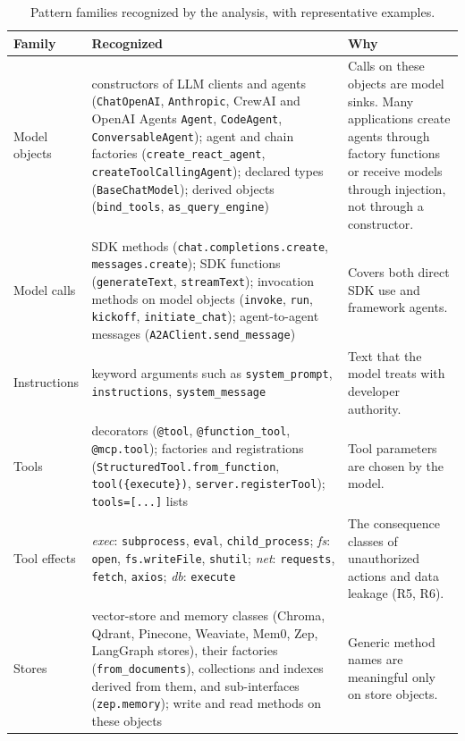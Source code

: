 \begin{table}[t]
\centering
\footnotesize
\renewcommand{\arraystretch}{1.2}
\setlength{\tabcolsep}{4pt}
\caption{Pattern families recognized by the analysis, with representative examples.}
\label{tab:df-recognition}
\begin{tabular}{@{}>{\raggedright\arraybackslash}p{}>{\raggedright\arraybackslash}p{}>{\raggedright\arraybackslash}p{}@{}}
\toprule
\textbf{Family} & \textbf{Recognized} & \textbf{Why} \\
\midrule
Model objects & constructors of LLM clients and agents (\texttt{ChatOpenAI}, \texttt{Anthropic}, CrewAI and OpenAI Agents \texttt{Agent}, \texttt{CodeAgent}, \texttt{ConversableAgent}); agent and chain factories (\texttt{create\_react\_agent}, \texttt{createToolCallingAgent}); declared types (\texttt{BaseChatModel}); derived objects (\texttt{bind\_tools}, \texttt{as\_query\_engine}) & Calls on these objects are model sinks. Many applications create agents through factory functions or receive models through injection, not through a constructor. \\
Model calls & SDK methods (\texttt{chat.completions.create}, \texttt{messages.create}); SDK functions (\texttt{generateText}, \texttt{streamText}); invocation methods on model objects (\texttt{invoke}, \texttt{run}, \texttt{kickoff}, \texttt{initiate\_chat}); agent-to-agent messages (\texttt{A2AClient.send\_message}) & Covers both direct SDK use and framework agents. \\
Instructions & keyword arguments such as \texttt{system\_prompt}, \texttt{instructions}, \texttt{system\_message} & Text that the model treats with developer authority. \\
Tools & decorators (\texttt{@tool}, \texttt{@function\_tool}, \texttt{@mcp.tool}); factories and registrations (\texttt{StructuredTool.from\_function}, \texttt{tool(\{execute\})}, \texttt{server.registerTool}); \texttt{tools=[...]} lists & Tool parameters are chosen by the model. \\
Tool effects & \emph{exec}: \texttt{subprocess}, \texttt{eval}, \texttt{child\_process}; \emph{fs}: \texttt{open}, \texttt{fs.writeFile}, \texttt{shutil}; \emph{net}: \texttt{requests}, \texttt{fetch}, \texttt{axios}; \emph{db}: \texttt{execute} & The consequence classes of unauthorized actions and data leakage (R5, R6). \\
Stores & vector-store and memory classes (Chroma, Qdrant, Pinecone, Weaviate, Mem0, Zep, LangGraph stores), their factories (\texttt{from\_documents}), collections and indexes derived from them, and sub-interfaces (\texttt{zep.memory}); write and read methods on these objects & Generic method names are meaningful only on store objects. \\

\end{tabular}
\end{table}
